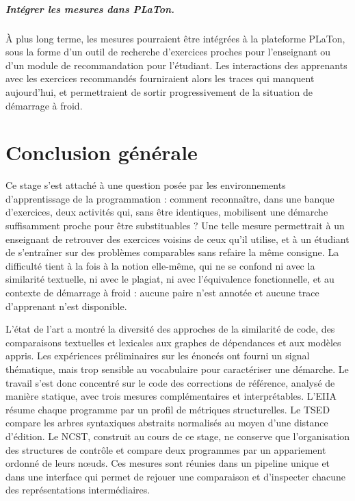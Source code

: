 \documentclass[12pt,a4paper,oneside]{report}
\begin{document}
\paragraph{Intégrer les mesures dans PLaTon.}
À plus long terme, les mesures pourraient être intégrées à la plateforme
PLaTon, sous la forme d'un outil de recherche d'exercices proches pour
l'enseignant ou d'un module de recommandation pour l'étudiant. Les
interactions des apprenants avec les exercices recommandés fourniraient
alors les traces qui manquent aujourd'hui, et permettraient de sortir
progressivement de la situation de démarrage à froid.

\chapter*{Conclusion générale}

Ce stage s'est attaché à une question posée par les environnements
d'apprentissage de la programmation : comment reconnaître, dans une banque
d'exercices, deux activités qui, sans être identiques, mobilisent une
démarche suffisamment proche pour être substituables ? Une telle mesure
permettrait à un enseignant de retrouver des exercices voisins de ceux
qu'il utilise, et à un étudiant de s'entraîner sur des problèmes
comparables sans refaire la même consigne. La difficulté tient à la fois à
la notion elle-même, qui ne se confond ni avec la similarité textuelle, ni
avec le plagiat, ni avec l'équivalence fonctionnelle, et au contexte de
démarrage à froid : aucune paire n'est annotée et aucune trace
d'apprenant n'est disponible.

L'état de l'art a montré la diversité des approches de la similarité de
code, des comparaisons textuelles et lexicales aux graphes de dépendances
et aux modèles appris. Les expériences préliminaires sur les énoncés ont
fourni un signal thématique, mais trop sensible au vocabulaire pour
caractériser une démarche. Le travail s'est donc concentré sur le code des
corrections de référence, analysé de manière statique, avec trois mesures
complémentaires et interprétables. L'EIIA résume chaque programme par un
profil de métriques structurelles. Le TSED compare les arbres syntaxiques
abstraits normalisés au moyen d'une distance d'édition. Le NCST, construit
au cours de ce stage, ne conserve que l'organisation des structures de
contrôle et compare deux programmes par un appariement ordonné de leurs
nœuds. Ces mesures sont réunies dans un pipeline unique et dans une
interface qui permet de rejouer une comparaison et d'inspecter chacune des
représentations intermédiaires.
\end{document}
